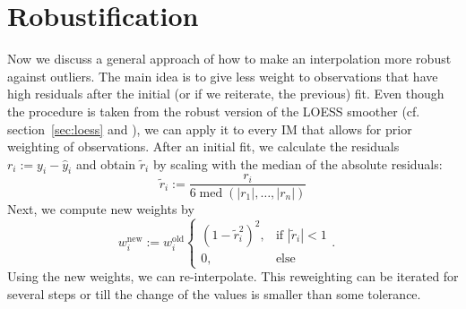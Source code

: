 \section{Robustification}{
	\label{sec:loess_robustify}
	{ %
		Now we discuss a general approach of how to make an interpolation more robust against outliers. The main idea is to give less weight to observations that have high residuals after the initial (or if we reiterate, the previous) fit.
		Even though the procedure is taken from the robust version of the LOESS smoother (cf. section~\ref{sec:loess} and \cite{clevelandRobustLocallyWeighted1979}), we can apply it to every {{IM}} that allows for prior weighting of observations.
	}
	{	
		After an initial fit, we calculate the residuals $r_i := y_i - \hat y_i$ and obtain $\tilde r_i$ by scaling with the median of the absolute residuals: 
		\begin{equation}
			\tilde r_i := \frac{r_i}{6\operatorname{med}\left(|r_1|,\dots,|r_n|\right)}
		\end{equation}
		Next, we compute new weights by
		\begin{equation}
			w_i^\text{new}:=w_i^\text{old} \begin{cases}
				\left(1-\tilde r_i^{2}\right)^{2}, & \text{if } |\tilde r_i|<1 \\
				0,                        & \text{else }
			\end{cases}.\quad
			\label{eq:bisquare}
		\end{equation}
		Using the new weights, we can re-interpolate. This reweighting can be iterated for several steps or till the change of the values is smaller than some tolerance.
}}
